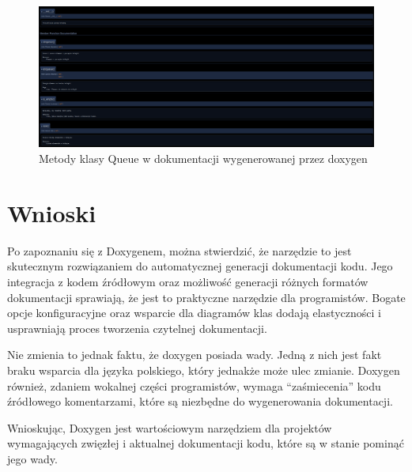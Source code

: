 \documentclass[a4paper,12pt]{article}
\begin{document}
\begin{figure}[ht]
    \centering
    \includegraphics[width=1\textwidth]{images/dox-2.png}
    \caption{Metody klasy Queue w dokumentacji wygenerowanej przez doxygen}
\end{figure}

\newpage
\clearpage

\section{Wnioski}
Po zapoznaniu się z Doxygenem, można stwierdzić, że narzędzie to jest skutecznym rozwiązaniem do automatycznej generacji dokumentacji kodu. Jego integracja z kodem źródłowym oraz możliwość generacji różnych formatów dokumentacji sprawiają, że jest to praktyczne narzędzie dla programistów. Bogate opcje konfiguracyjne oraz wsparcie dla diagramów klas dodają elastyczności i usprawniają proces tworzenia czytelnej dokumentacji.

Nie zmienia to jednak faktu, że doxygen posiada wady. Jedną z nich jest fakt braku wsparcia dla języka polskiego, który jednakże może ulec zmianie. Doxygen również, zdaniem wokalnej części programistów, wymaga ``zaśmiecenia'' kodu źródłowego komentarzami, które są niezbędne do wygenerowania dokumentacji.

Wnioskując, Doxygen jest wartościowym narzędziem dla projektów wymagających zwięzłej i aktualnej dokumentacji kodu, które są w stanie pominąć jego wady.

\printbibliography[title={Bibliografia}, heading=bibintoc]
\nocite{*}
\end{document}
